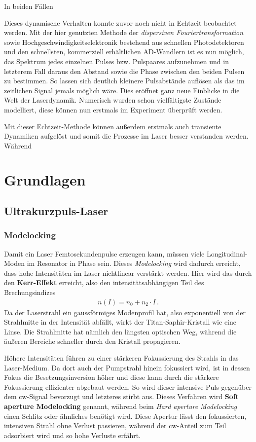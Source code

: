 \documentclass[bachelor,       %
               twoside,        %
               BCOR10mm,       %
               english,ngerman, %
               ]{GAUBM}
\begin{document}
In beiden Fällen

Dieses dynamische Verhalten konnte zuvor noch nicht in Echtzeit beobachtet werden.
Mit der hier genutzten Methode der \textit{dispersiven Fouriertransformation} sowie Hochgeschwindigkeitselektronik bestehend aus schnellen Photodetektoren und den schnellsten, kommerziell erhältlichen AD-Wandlern ist es nun möglich, das Spektrum jedes einzelnen Pulses bzw. Pulspaares aufzunehmen und in letzterem Fall daraus den Abstand sowie die Phase zwischen den beiden Pulsen zu bestimmen.
So lassen sich deutlich kleinere Pulsabstände auflösen als das im zeitlichen Signal jemals möglich wäre.
Dies eröffnet ganz neue Einblicke in die Welt der Laserdynamik.
Numerisch wurden schon vielfältigste Zustände modelliert, diese können nun erstmals im Experiment überprüft werden.

Mit dieser Echtzeit-Methode können außerdem erstmals auch transiente Dynamiken aufgelöst und somit die Prozesse im Laser besser verstanden werden.
Während \cite{herink_resolving_2016}

\chapter{Grundlagen}

\section{Ultrakurzpuls-Laser}
\subsection{Modelocking}
Damit ein Laser Femtosekundenpulse erzeugen kann, müssen viele Longitudinal-Moden im Resonator in Phase sein.
Dieses \emph{Modelocking} wird dadurch erreicht, dass hohe Intensitäten im Laser nichtlinear verstärkt werden.
Hier wird das durch den \textbf{Kerr-Effekt} erreicht, also den intensitätsabhängigen Teil des Brechungsindizes
\begin{align}
	n(I)=n_0+n_2\cdot I\,.
	\label{eq:kerr}
\end{align}
Da der Laserstrahl ein gaussförmiges Modenprofil hat, also exponentiell von der Strahlmitte in der Intensität abfällt, wirkt der Titan-Saphir-Kristall wie eine Linse.
Die Strahlmitte hat nämlich den längsten optischen Weg, während die äußeren Bereiche schneller durch den Kristall propagieren.

Höhere Intensitäten führen zu einer stärkeren Fokussierung des Strahls in das Laser-Medium.
Da dort auch der Pumpstrahl hinein fokussiert wird, ist in dessen Fokus die Besetzungsinversion höher und diese kann durch die stärkere Fokussierung effizienter abgebaut werden.
So wird dieser intensive Puls gegenüber dem cw-Signal bevorzugt und letzteres stirbt aus.
Dieses Verfahren wird \textbf{Soft aperture Modelocking} genannt, während beim \textit{Hard aperture Modelocking} einen Schlitz oder ähnliches benötigt wird.
Diese Apertur lässt den fokussierten, intensiven Strahl ohne Verlust passieren, während der cw-Anteil zum Teil adsorbiert wird und so hohe Verluste erfährt.
\end{document}
